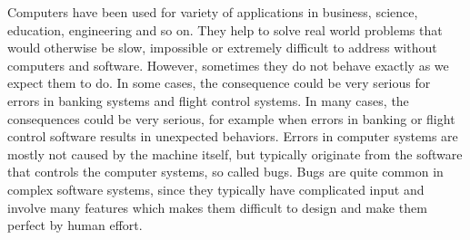 \label{chapter:verification}

Computers have been used for variety of applications in business, science, education, engineering and so on. They help to solve real world problems that would otherwise be slow, impossible or extremely difficult to address without computers and software. However, sometimes they do not behave exactly as we expect them to do. 
In some cases, the consequence could be very serious for errors in banking systems
and flight control systems.
{In many cases, the consequences could be very serious, for example when errors
in banking or flight control software results in unexpected behaviors.}
Errors in computer systems are mostly not caused by the machine itself, but typically originate from the software that controls the computer systems, so called bugs. 
%
Bugs are quite common  in complex software systems,
since they typically have complicated input and involve many features which makes them difficult to design and make them perfect by human effort.
